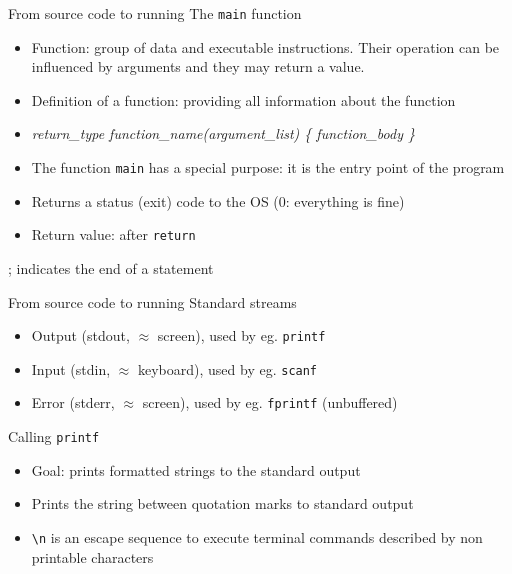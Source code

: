 \documentclass[usenames,dvipsnames,aspectratio=169]{beamer}
\newcommand{\kiemel}[1]{{\color{kiemelesszin}#1}}
\begin{document}
\begin{frame}{From source code to running}
  The \texttt{\kiemel{main}} function
  \begin{itemize}
    \item Function: group of data and executable instructions. Their operation can be influenced by arguments and they may return a value.
    \item \kiemel{Definition} of a function: providing all information about the function
    \item \emph{return\_type function\_name(argument\_list) \{ function\_body \}}
    \item The function \texttt{main} has a special purpose: it is the \kiemel{entry point} of the program
    \item Returns a status (exit) code to the OS (0: everything is fine)
    \item Return value: after \texttt{\kiemel{return}}
  \end{itemize}
  \kiemel{;} indicates the end of a statement
\end{frame}

\begin{frame}{From source code to running}
  Standard streams
  \begin{itemize}
    \item Output (stdout, $\approx$ screen), used by eg. \texttt{\kiemel{printf}}
    \item Input (stdin, $\approx$ keyboard), used by eg. \texttt{scanf}
    \item Error (stderr, $\approx$ screen), used by eg. \texttt{fprintf} (unbuffered)
  \end{itemize}
  Calling \texttt{printf}
  \begin{itemize}
    \item Goal: prints formatted strings to the standard output
    \item Prints the string between quotation marks to standard output
    \item \texttt{\kiemel{\textbackslash n}} is an escape sequence to execute terminal commands described by non printable characters
  \end{itemize}
\end{frame}
\end{document}
